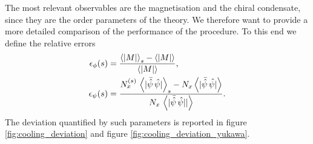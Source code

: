 \newpage
The most relevant observables are the magnetisation and the chiral condensate, since they are the order parameters of the theory. We therefore want to provide a more detailed comparison of the performance of the procedure. To this end we define the relative errors
\begin{equation}
    \begin{aligned}
        \epsilon_\phi(s) &= \frac{\left\langle |M| \right\rangle_{s} - \left\langle |M| \right\rangle}{\left\langle |M| \right\rangle}, \\
        \epsilon_\psi(s) &= \frac{N_x^{(s)} \,\left\langle |\bar{\hat\psi} \, \hat{\psi}| \right\rangle_{s} - N_x\left\langle |\bar{\hat\psi} \, \hat{\psi|} \right\rangle}{N_x \, \left\langle |\bar{\hat\psi} \, \hat{\psi}|| \right\rangle}.
    \end{aligned}
    \label{eq:cooling_relative_deviation}
\end{equation}
The deviation quantified by such parameters is reported in figure \ref{fig:cooling_deviation} and  figure \ref{fig:cooling_deviation_yukawa}.
